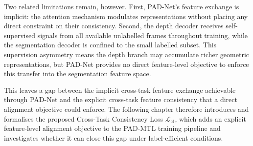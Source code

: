 Two related limitations remain, however. First, PAD-Net's feature
exchange is implicit: the attention mechanism modulates representations
without placing any direct constraint on their consistency. Second, the
depth decoder receives self-supervised signals from all available
unlabelled frames throughout training, while the segmentation decoder is
confined to the small labelled subset. This supervision asymmetry means
the depth branch may accumulate richer geometric representations, but
PAD-Net provides no direct feature-level objective to enforce this
transfer into the segmentation feature space.

This leaves a gap between the implicit cross-task feature exchange
achievable through PAD-Net and the explicit cross-task feature
consistency that a direct alignment objective could enforce. The
following chapter therefore introduces and formalises the proposed
Cross-Task Consistency Loss $\mathcal{L}_\text{ct}$, which adds an
explicit feature-level alignment objective to the PAD-MTL training
pipeline and investigates whether it can close this gap under
label-efficient conditions.